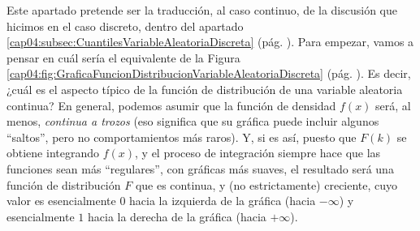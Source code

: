 Este apartado pretende ser la traducción, al caso continuo, de la discusión que hicimos en el caso discreto, dentro del apartado \ref{cap04:subsec:CuantilesVariableAleatoriaDiscreta} (pág. \pageref{cap04:subsec:CuantilesVariableAleatoriaDiscreta}). Para empezar, vamos a pensar en cuál sería el equivalente de la Figura \ref{cap04:fig:GraficaFuncionDistribucionVariableAleatoriaDiscreta} (pág. \pageref{cap04:fig:GraficaFuncionDistribucionVariableAleatoriaDiscreta}). Es decir, ¿cuál es el aspecto típico de la función de distribución de una variable aleatoria continua? En general, podemos asumir que la función de densidad $f(x)$ será, al menos, {\em continua a trozos} (eso significa que su gráfica puede incluir algunos ``saltos'', pero no comportamientos más raros). Y, si es así, puesto que $F(k)$ se obtiene integrando $f(x)$, y el proceso de integración siempre hace que las funciones sean más ``regulares'', con gráficas más suaves,  el resultado será una función de distribución $F$ que es continua, y (no estrictamente) creciente, cuyo valor es esencialmente $0$ hacia la izquierda de la gráfica (hacia $-\infty$) y esencialmente $1$ hacia la derecha de la gráfica (hacia $+\infty$).

